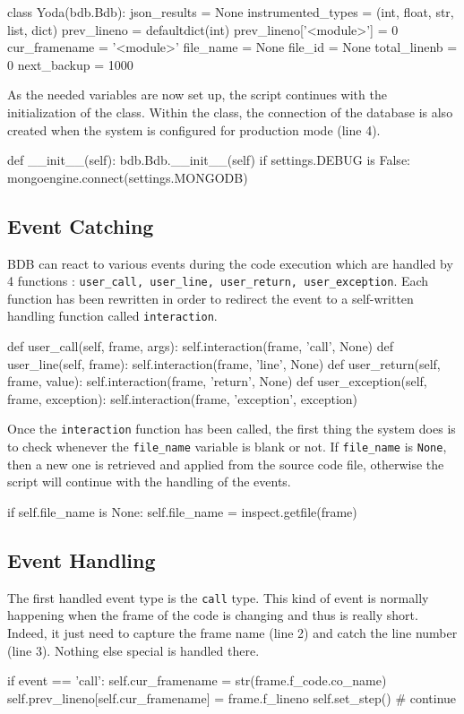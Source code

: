 \begin{python}
class Yoda(bdb.Bdb):
    json_results = None
    instrumented_types = (int, float, str, list, dict)
    prev_lineno = defaultdict(int)
    prev_lineno['<module>'] = 0 
    cur_framename = '<module>'
    file_name = None
    file_id = None 
    total_linenb = 0
    next_backup = 1000
\end{python}

As the needed variables are now set up, the script continues with the initialization of the  class. Within the class, the connection of the database is also created when the system is configured for production mode (line 4). 

\begin{python}
def __init__(self):
    bdb.Bdb.__init__(self)
    if settings.DEBUG is False:
        mongoengine.connect(settings.MONGODB)
\end{python}

\subsection{Event Catching}

BDB can react to various events during the code execution which are handled by 4 functions : \texttt{user\_call, user\_line, user\_return, user\_exception}. Each function has been rewritten in order to redirect the event to a self-written handling function called \texttt{interaction}. 
\smallskip
\begin{python}
def user_call(self, frame, args):
    self.interaction(frame, 'call', None)
def user_line(self, frame):
    self.interaction(frame, 'line', None)
def user_return(self, frame, value):
    self.interaction(frame, 'return', None)
def user_exception(self, frame, exception):
    self.interaction(frame, 'exception', exception)
\end{python}

Once the \texttt{interaction} function has been called, the first thing the system does is to check whenever the \texttt{file\_name} variable is blank or not. If \texttt{file\_name} is \texttt{None}, then a new one is retrieved and applied from the source code file, otherwise the script will continue with the handling of the events.
\begin{python}
if self.file_name is None:
    self.file_name = inspect.getfile(frame)
\end{python}

\subsection{Event Handling}
The first handled event type is the \texttt{call} type. This kind of event is normally happening when the frame of the code is changing and thus is really short. Indeed, it just need to capture the frame name (line 2) and catch the line number (line 3). Nothing else special is handled there.
\begin{python}
if event == 'call':
    self.cur_framename = str(frame.f_code.co_name)
    self.prev_lineno[self.cur_framename] = frame.f_lineno
    self.set_step() # continue
\end{python}


